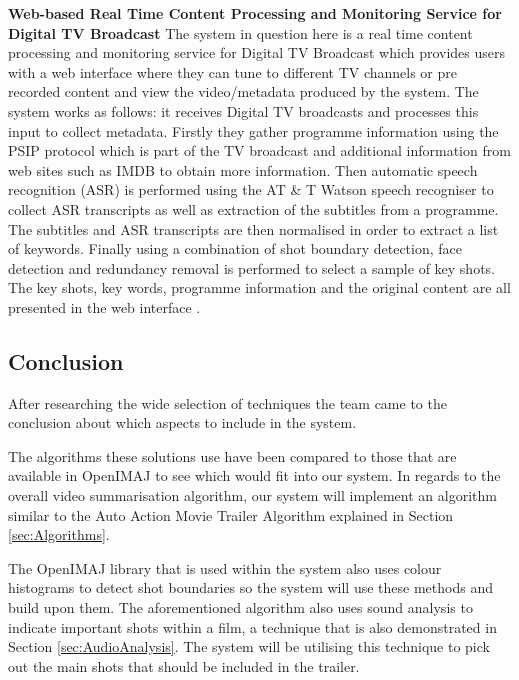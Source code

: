 \textbf{Web-based Real Time Content Processing and Monitoring Service for
Digital TV Broadcast}
\newline
The system in question here is a real time content processing and monitoring service for Digital TV Broadcast which provides users with 
a web interface where they can tune to different TV channels or pre recorded content and view the video/metadata produced by the system. The system works as follows: it receives Digital TV broadcasts and processes this input
to collect metadata. Firstly they gather programme information using the PSIP protocol which is part of the TV broadcast and additional 
information from web sites such as IMDB to obtain more information. Then automatic speech recognition (ASR) is performed using the AT \& T Watson speech recogniser to collect ASR transcripts as well as extraction of the subtitles from a programme. The subtitles and ASR transcripts are then normalised in order to extract a list of keywords. Finally using a combination of shot boundary detection, face detection and redundancy removal  is performed to select a sample of key shots. The key shots, key words, programme information and the original content are all presented in the web interface \cite{ProcessingDigitalTV} .

\subsection{Conclusion}
After researching the wide selection of techniques the team came to the conclusion about which aspects to include in the system. 

The algorithms these solutions use have been compared to those that are available in OpenIMAJ to see which would fit into our system. In regards to the overall video summarisation algorithm,
our system will implement an algorithm similar to the Auto Action Movie Trailer Algorithm
explained in Section \ref{sec:Algorithms}.

The OpenIMAJ library \cite{citeOpenImaj} that is used within the system also uses colour histograms to detect shot boundaries so the system will use these methods and build upon them. The aforementioned algorithm also uses sound analysis to indicate important shots within a film, a technique that is also demonstrated in Section \ref{sec:AudioAnalysis}. The system will be utilising this technique to pick out the main shots that should be included in the trailer. 
